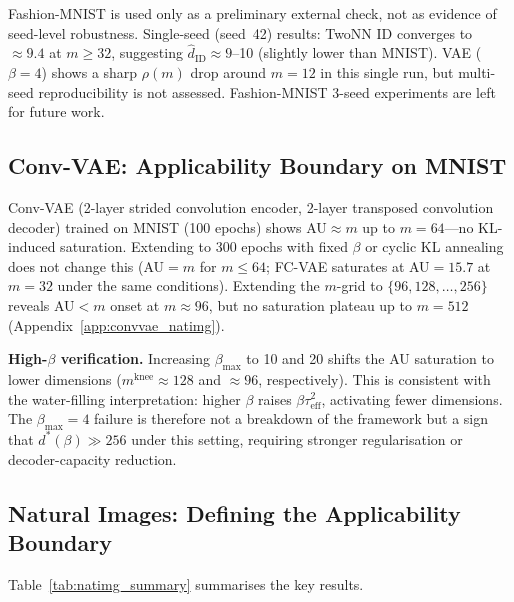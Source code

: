\documentclass[11pt,a4paper]{article}
\newcommand{\mknee}{m^{\mathrm{knee}}}
\newcommand{\hatdID}{\hat{d}_{\mathrm{ID}}}
\begin{document}
Fashion-MNIST is used only as a preliminary external check, not as
evidence of seed-level robustness.
Single-seed (seed~42) results: TwoNN ID converges to $\approx9.4$ at $m\geq32$,
suggesting $\hatdID\approx9$--10 (slightly lower than MNIST).
VAE ($\beta=4$) shows a sharp $\rho(m)$ drop around $m=12$ in this single run,
but multi-seed reproducibility is not assessed.
Fashion-MNIST 3-seed experiments are left for future work.

\subsection{Conv-VAE: Applicability Boundary on MNIST}\label{sec:exp_conv}

Conv-VAE (2-layer strided convolution encoder, 2-layer transposed convolution
decoder) trained on MNIST (100 epochs) shows AU$\approx m$ up to $m=64$---no
KL-induced saturation.
Extending to 300 epochs with fixed $\beta$ or cyclic KL annealing does not
change this (AU$=m$ for $m\leq64$; FC-VAE saturates at AU$=15.7$ at $m=32$
under the same conditions).
Extending the $m$-grid to $\{96,128,\ldots,256\}$ reveals AU$<m$ onset at
$m\approx96$, but no saturation plateau up to $m=512$ (Appendix~\ref{app:convvae_natimg}).

\textbf{High-$\beta$ verification.}
Increasing $\beta_{\max}$ to 10 and 20 shifts the AU saturation to lower
dimensions ($\mknee\approx128$ and $\approx96$, respectively).
This is consistent with the water-filling interpretation: higher $\beta$ raises
$\beta\tau^2_{\mathrm{eff}}$, activating fewer dimensions.
The $\beta_{\max}=4$ failure is therefore not a breakdown of the framework but
a sign that $d^*(\beta)\gg256$ under this setting, requiring stronger
regularisation or decoder-capacity reduction.

\subsection{Natural Images: Defining the Applicability Boundary}\label{sec:exp_natural}

Table~\ref{tab:natimg_summary} summarises the key results.
\end{document}

